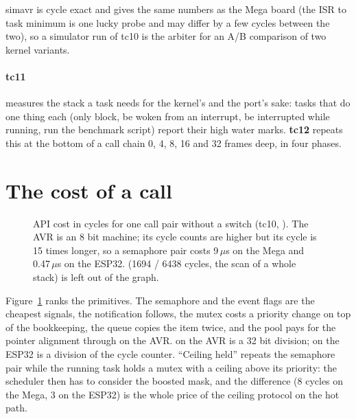simavr is cycle exact and gives the same numbers as the Mega board (the ISR to task
minimum is one lucky probe and may differ by a few cycles between the two), so a
simulator run of tc10 is the arbiter for an A/B comparison of two kernel variants.

\paragraph{tc11} measures the stack a task needs for the kernel's and the port's sake:
tasks that do one thing each (only block, be woken from an interrupt, be interrupted
while running, run the benchmark script) report their high water marks. \textbf{tc12}
repeats this at the bottom of a call chain 0, 4, 8, 16 and 32 frames deep, in four
phases.

\section{The cost of a call}

\begin{figure}[htbp]
\centering
{}
\caption{API cost in cycles for one call pair without a switch (tc10, \measDate). The
AVR is an 8 bit machine; its cycle counts are higher but its cycle is 15 times longer,
so a semaphore pair costs 9\,$\mu$s on the Mega and 0.47\,$\mu$s on the ESP32.
 (1694 / 6438 cycles, the scan of a whole stack) is left out of the
graph.}
\label{fig:api}
\end{figure}

Figure~\ref{fig:api} ranks the primitives. The semaphore and the event flags are the
cheapest signals, the notification follows, the mutex costs a priority change on top of
the bookkeeping, the queue copies the item twice, and the pool pays for the pointer
alignment through  on the AVR.  on the AVR is a 32 bit
division;  on the ESP32 is a division of the cycle counter. ``Ceiling
held'' repeats the semaphore pair while the running task holds a mutex with a ceiling
above its priority: the scheduler then has to consider the boosted mask, and the
difference (8 cycles on the Mega, 3 on the ESP32) is the whole price of the ceiling
protocol on the hot path.

